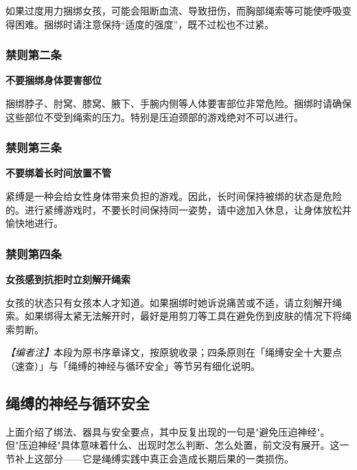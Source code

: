 \documentclass[12pt,UTF8]{ctexbook}
\begin{document}
如果过度用力捆绑女孩，可能会阻断血流、导致扭伤，而胸部绳索等可能使呼吸变得困难。捆绑时请注意保持“适度的强度”，既不过松也不过紧。

\subsubsection{禁则第二条}

\textbf{不要捆绑身体要害部位}

捆绑脖子、肘窝、膝窝、腋下、手腕内侧等人体要害部位非常危险。捆绑时请确保这些部位不受到绳索的压力。特别是压迫颈部的游戏绝对不可以进行。

\subsubsection{禁则第三条}

\textbf{不要绑着长时间放置不管}

紧缚是一种会给女性身体带来负担的游戏。因此，长时间保持被绑的状态是危险的。进行紧缚游戏时，不要长时间保持同一姿势，请中途加入休息，让身体放松并愉快地进行。

\subsubsection{禁则第四条}

\textbf{女孩感到抗拒时立刻解开绳索}

女孩的状态只有女孩本人才知道。如果捆绑时她诉说痛苦或不适，请立刻解开绳索。如果绑得太紧无法解开时，最好是用剪刀等工具在避免伤到皮肤的情况下将绳索剪断。

\noindent\textit{【编者注】}本段为原书序章译文，按原貌收录；四条原则在「绳缚安全十大要点（速查）」与「绳缚的神经与循环安全」等节另有细化说明。

\subsection{绳缚的神经与循环安全}\label{sec:ropesafety}

上面介绍了绑法、器具与安全要点，其中反复出现的一句是"避免压迫神经"。但"压迫神经"具体意味着什么、出现时怎么判断、怎么处置，前文没有展开。这一节补上这部分——它是绳缚实践中真正会造成长期后果的一类损伤。
\end{document}
